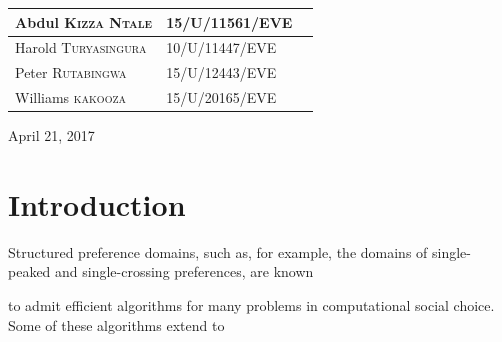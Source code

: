 \documentclass[12pt, a4paper]{report}
\begin{document}
\begin{titlepage}


\begin{table}[!hb]
\centering
\begin{tabular}{|l|l|l|}
\hline
Abdul \textsc{Kizza Ntale} & \textsc{15/U/11561/EVE} \\ \hline
Harold \textsc{Turyasingura} & \textsc{10/U/11447/EVE} \\ \hline
Peter \textsc{Rutabingwa} & \textsc{15/U/12443/EVE} \\ \hline
Williams \textsc{kakooza} & \textsc{15/U/20165/EVE} \\
\hline
\end{tabular}
\end{table}

{\large April 21, 2017}

\vfill

\end{titlepage}

\tableofcontents
\newpage

\sectionfont{\scshape}
\section*{Introduction}
Structured preference domains, such as, for example, the domains of single-peaked and single-crossing preferences, are known 

to admit efficient algorithms for many problems in computational social choice. Some of these algorithms extend to 
\end{document}

